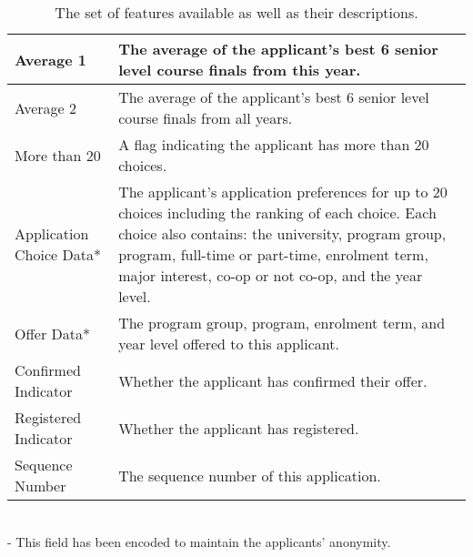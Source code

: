 \documentclass[titlepage]{article}
\begin{document}
\begin{table}[!hb]
\begin{center}
\begin{tabular}{| C{4cm} | C{10cm} |}
	Average 1						&The average of the applicant's best 6 senior level course finals from this year.\\\hline
	Average 2						&The average of the applicant's best 6 senior level course finals from all years.\\\hline
	More than 20					&A flag indicating the applicant has more than 20 choices.\\\hline
	Application Choice Data*		&The applicant's application preferences for up to 20 choices including the ranking of each choice. Each choice also contains: the university, program group, program, full-time or part-time, enrolment term, major interest, co-op or not co-op, and the year level.\\\hline
	Offer Data*						&The program group, program, enrolment term, and year level offered to this applicant.\\\hline
	Confirmed Indicator				&Whether the applicant has confirmed their offer.\\\hline
	Registered Indicator			&Whether the applicant has registered.\\\hline
	Sequence Number					&The sequence number of this application.\\\hline
\end{tabular}
\caption{ The set of features available as well as their descriptions.}
\end{center}
\end{table}
~\\
\small* - This field has been encoded to maintain the applicants' anonymity.

\vspace*{\fill}
\newpage
\end{document}
